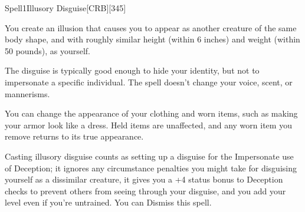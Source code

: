 
\begin{card}{Spell}{1}{Illusory Disguise}[CRB][345]



\bgroup
\engschrift\small

You create an illusion that causes you to appear as another creature of the same body shape,
and with roughly similar height (within 6 inches) and weight (within 50 pounds), as yourself.

The disguise is typically good enough to hide your identity, but not to impersonate a specific individual.
The spell doesn't change your voice, scent, or mannerisms.

You can change the appearance of your clothing and worn items, such as making your armor look like a dress.
Held items are unaffected, and any worn item you remove returns to its true appearance.

Casting illusory disguise counts as setting up a disguise for the Impersonate use of Deception;
it ignores any circumstance penalties you might take for disguising yourself as a dissimilar creature,
it gives you a +4 status bonus to Deception checks to prevent others from seeing through your disguise,
and you add your level even if you're untrained.
You can Dismiss this spell.

\egroup
\end{card}



